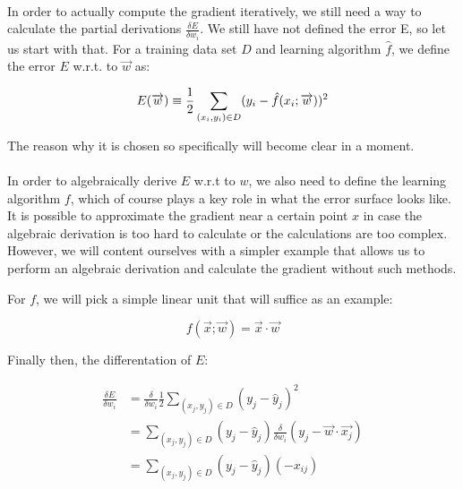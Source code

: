 \paragraph{}
In order to actually compute the gradient iteratively,
we still need a way to calculate the partial derivations
$\frac{\delta E}{\delta w_i}$.
We still have not defined the error E,
so let us start with that.
For a training data set $D$
and learning algorithm $\hat{f}$,
we define the error $E$ w.r.t. to
$\overrightarrow{w}$ as:

\begin{equation}
  E(\overrightarrow{w}) \equiv \frac{1}{2} \\
  \sum_{(x_i, y_i) \in D}(y_i - \hat{f}(x_i; \overrightarrow{w}))^2
\end{equation}

The reason why it is chosen so specifically
will become clear in a moment.

\paragraph{}
In order to algebraically derive $E$ w.r.t to $w$,
we also need to define the learning algorithm $f$,
which of course plays a key role
in what the error surface looks like.
It is possible to approximate
the gradient near a certain point $x$
in case the algebraic derivation is too hard to calculate
or the calculations are too complex.
However, we will content ourselves with a simpler example
that allows us to perform an algebraic derivation
and calculate the gradient without such methods.

For $f$, we will pick
a simple linear unit that will suffice as an example:

$$
f(\overrightarrow{x};\overrightarrow{w}) = \overrightarrow{x} \cdot \overrightarrow{w}
$$

Finally then, the differentation of $E$:

\begin{equation}
  \begin{split}
    \frac{\delta E}{\delta w_i} &= \frac{\delta}{\delta w_i} \frac{1}{2}
    \sum_{(x_j, y_j) \in D} (y_j - \hat{y}_j)^2 \\
    &= \sum_{(x_j, y_j) \in D}(y_j - \hat{y}_j)
    \frac{\delta}{\delta w_i}(y_j - \overrightarrow{w} \cdot \overrightarrow{x_j}) \\
    &= \sum_{(x_j, y_j) \in D}(y_j - \hat{y}_j)(-x_{ij})
  \end{split}
\end{equation}

